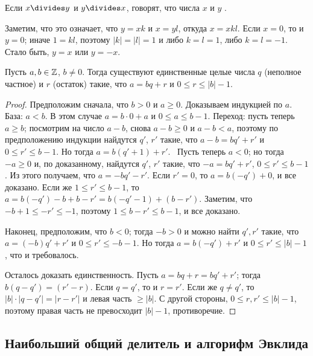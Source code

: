 \begin{definition}
Если $x\divides y$ и $y\divides x$, говорят, что числа $x$ и $y$
.
\end{definition}

\begin{remark}\label{rem:integers_up_to_sign}
Заметим, что это означает, что $y=xk$ и $x=yl$, откуда $x=xkl$. Если
$x=0$, то и $y=0$; иначе $1=kl$, поэтому $|k|=|l|=1$ и либо $k=l=1$,
либо $k=l=-1$. Стало быть, $y=x$ или $y=-x$.
\end{remark}


\begin{theorem}
Пусть $a,b\in\mathbb Z$, $b\neq 0$. Тогда существуют единственные целые
числа $q$ (неполное частное) и $r$ (остаток) такие, что $a=bq+r$ и
$0\leq r\leq |b|-1$.
\end{theorem}
\begin{proof}
Предположим сначала, что $b>0$ и $a\geq 0$.
Доказываем индукцией по $a$.
База: $a<b$. В этом случае $a=b\cdot 0+a$ и $0\leq a\leq b-1$.
Переход: пусть теперь $a\geq b$; посмотрим на число $a-b$, снова
$a-b\geq 0$ и $a-b<a$, поэтому по предположению индукции найдутся
$q'$, $r'$ такие, что $a-b=bq'+r'$ и $0\leq r'\leq b-1$. Но тогда
$a=b(q'+1)+r'$.
\
Пусть теперь $a<0$; но тогда $-a\geq 0$ и, по доказанному, найдутся
$q'$, $r'$ такие, что $-a=bq'+r'$, $0\leq r'\leq b-1$.
Из этого
получаем, что $a=-bq'-r'$. Если $r'=0$, то $a=b(-q')+0$, и все
доказано.
Если же $1\leq r'\leq b-1$, то $a=b(-q')-b+b-r'=b(-q'-1)+(b-r')$. Заметим, что
$-b+1\leq -r'\leq -1$, поэтому $1\leq b-r'\leq b-1$, и все доказано.

Наконец, предположим, что $b<0$; тогда $-b>0$ и можно найти $q',r'$
такие, что $a=(-b)q'+r'$ и $0\leq r'\leq -b-1$. Но тогда $a=b(-q')+r'$
и $0\leq r'\leq |b|-1$, что и требовалось.

Осталось доказать единственность. Пусть $a=bq+r=bq'+r'$; тогда
$b(q-q')=(r'-r)$. Если $q=q'$, то и $r=r'$. Если же $q\neq q'$, то
$|b|\cdot |q-q'|=|r-r'|$ и левая часть $\geq |b|$. С другой стороны,
$0\leq r,r'\leq |b|-1$, поэтому правая часть не превосходит
$|b|-1$, противоречие.
\end{proof}

\subsection{Наибольший общий делитель и алгорифм Эвклида}

